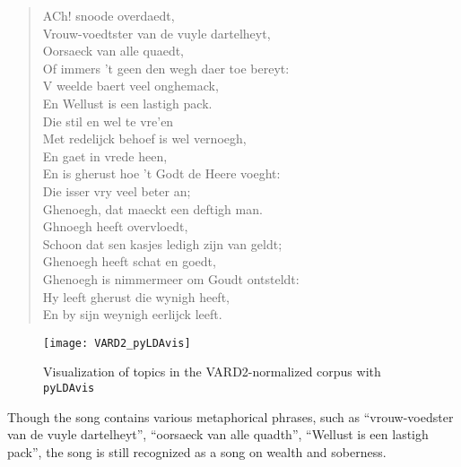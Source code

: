 \begin{quote}
	ACh! snoode overdaedt,\\
	Vrouw-voedtster van de vuyle dartelheyt,\\
	Oorsaeck van alle quaedt,\\
	Of immers 't geen den wegh daer toe bereyt:\\
	V weelde baert veel onghemack,\\
	En Wellust is een lastigh pack.\\
	
	Die stil en wel te vre'en\\
	Met redelijck behoef is wel vernoegh,\\
	En gaet in vrede heen,\\
	En is gherust hoe 't Godt de Heere voeght:\\
	Die isser vry veel beter an;\\
	Ghenoegh, dat maeckt een deftigh man.\\
	
	Ghnoegh heeft overvloedt,\\
	Schoon dat sen kasjes ledigh zijn van geldt;\\
	Ghenoegh heeft schat en goedt,\\
	Ghenoegh is nimmermeer om Goudt ontsteldt:\\
	Hy leeft gherust die wynigh heeft,\\
	En by sijn weynigh eerlijck leeft.
\end{quote}

\begin{figure}[hbt!]
	\centering
	\texttt{[image: VARD2\_pyLDAvis]}
	\caption{Visualization of topics in the VARD2-normalized corpus with \texttt{pyLDAvis}}
	\label{fig:pyLDAvisVARD2}
\end{figure}

\noindent Though the song contains various metaphorical phrases, such as \enquote{vrouw-voedster van de vuyle dartelheyt}, \enquote{oorsaeck van alle quadth}, \enquote{Wellust is een lastigh pack}, the song is still recognized as a song on wealth and soberness.

